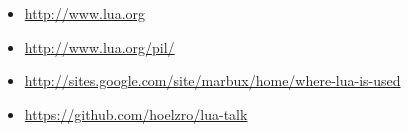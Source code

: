 \begin{frame}

\begin{itemize}
\item \scriptsize{\url{http://www.lua.org}}
\item \scriptsize{\url{http://www.lua.org/pil/}}
\item \scriptsize{\url{http://sites.google.com/site/marbux/home/where-lua-is-used}}
\item \scriptsize{\url{https://github.com/hoelzro/lua-talk}}
\end{itemize}

\end{frame}
